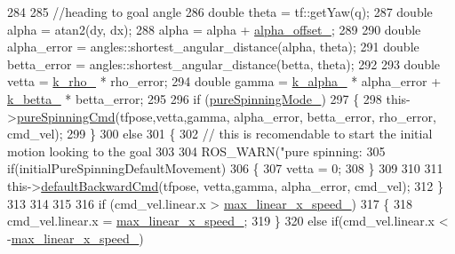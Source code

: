 \begin{DoxyCode}
284 
285     \textcolor{comment}{//heading to goal angle}
286     \textcolor{keywordtype}{double} theta = tf::getYaw(q);
287     \textcolor{keywordtype}{double} alpha = atan2(dy, dx);
288     alpha = alpha + \hyperlink{classbackward__local__planner_1_1BackwardLocalPlanner_a5897f084e4829cb5edd2f1fce5fe2546}{alpha\_offset\_};
289 
290     \textcolor{keywordtype}{double} alpha\_error = angles::shortest\_angular\_distance(alpha, theta);
291     \textcolor{keywordtype}{double} betta\_error = angles::shortest\_angular\_distance(betta, theta);
292 
293     \textcolor{keywordtype}{double} vetta = \hyperlink{classbackward__local__planner_1_1BackwardLocalPlanner_a4060acf69c2590984eb87d8e04a82699}{k\_rho\_} * rho\_error;
294     \textcolor{keywordtype}{double} gamma = \hyperlink{classbackward__local__planner_1_1BackwardLocalPlanner_ab8a4ea2b7fe9f21c07acac7121d4dd3e}{k\_alpha\_} * alpha\_error + \hyperlink{classbackward__local__planner_1_1BackwardLocalPlanner_a655def0b0657ac145737cd72229ad82a}{k\_betta\_} * betta\_error;
295 
296     \textcolor{keywordflow}{if} (\hyperlink{classbackward__local__planner_1_1BackwardLocalPlanner_a04a769cc9f1ae5170b06c92edfbb80f6}{pureSpinningMode\_})
297     \{
298         this->\hyperlink{classbackward__local__planner_1_1BackwardLocalPlanner_af8ae130a16e3f7f5d4044d92982ee073}{pureSpinningCmd}(tfpose,vetta,gamma, alpha\_error, betta\_error,  rho\_error, 
      cmd\_vel);
299     \}
300     \textcolor{keywordflow}{else}
301     \{
302         \textcolor{comment}{// this is recomendable to start the initial motion looking to the goal}
303 
304         ROS\_WARN(\textcolor{stringliteral}{"pure spinning: %
305         \textcolor{keywordflow}{if}(initialPureSpinningDefaultMovement)
306         \{
307             vetta = 0;
308         \}
309 
310 
311         this->\hyperlink{classbackward__local__planner_1_1BackwardLocalPlanner_aeeb7c645f6965c3c400a948d74cdc7b1}{defaultBackwardCmd}(tfpose, vetta,gamma, alpha\_error, cmd\_vel);
312     \}
313 
314 
315  
316     \textcolor{keywordflow}{if} (cmd\_vel.linear.x > \hyperlink{classbackward__local__planner_1_1BackwardLocalPlanner_a649fccd71e53ae248ee2f51506e381d2}{max\_linear\_x\_speed\_})
317     \{
318         cmd\_vel.linear.x = \hyperlink{classbackward__local__planner_1_1BackwardLocalPlanner_a649fccd71e53ae248ee2f51506e381d2}{max\_linear\_x\_speed\_};
319     \}
320     \textcolor{keywordflow}{else} \textcolor{keywordflow}{if}(cmd\_vel.linear.x < -\hyperlink{classbackward__local__planner_1_1BackwardLocalPlanner_a649fccd71e53ae248ee2f51506e381d2}{max\_linear\_x\_speed\_})
}
\end{DoxyCode}
